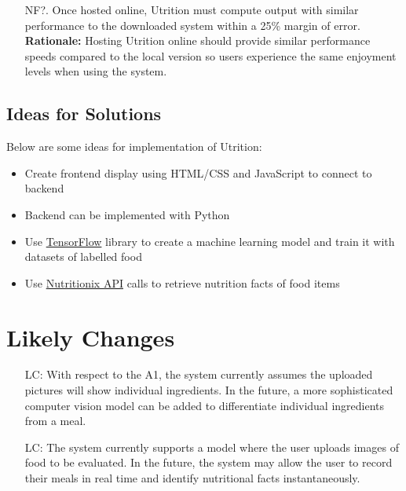 \documentclass[12pt]{article}
\newcounter{lcnum} %
\begin{document}
{\begin{itemize}
	\item [NF?.] Once hosted online, Utrition must compute output with similar performance to the downloaded system within a 25\% margin of error.\newline
	\textbf{Rationale:} Hosting Utrition online should provide similar performance speeds compared to the local version so users experience the same enjoyment levels when using the system.
	
\end{itemize}

\subsection{Ideas for Solutions}

Below are some ideas for implementation of Utrition:

\begin{itemize}
	\item Create frontend display using HTML/CSS and JavaScript to connect to backend
	\item Backend can be implemented with Python
	\item Use \href{https://www.tensorflow.org/}{TensorFlow} library to create a machine learning model and train it with datasets of labelled food
	\item Use \href{https://www.nutritionix.com/business/api}{Nutritionix API} calls to retrieve nutrition facts of food items
\end{itemize}

\section{Likely Changes}   

\noindent \begin{itemize}

\item[LC\refstepcounter{lcnum}\thelcnum\label{LC_meaningfulLabel}:] 
With respect to the A1, the system currently assumes the uploaded pictures will 
show individual ingredients. In the future, a more sophisticated computer 
vision model can be added to differentiate individual ingredients from a meal.

\item[LC\refstepcounter{lcnum}\thelcnum\label{LC_meaningfulLabel}:] 
The system currently supports a model where the user uploads images of food to 
be evaluated. In the future, the system may allow the user to record their 
meals in real time and identify nutritional facts instantaneously.


\end{itemize}}
\end{document}
